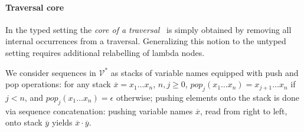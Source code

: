 \documentclass{elsarticle}
\theoremstyle{plain}
\theoremstyle{definition}
\newcommand\VarSet{\mathcal{V}}
\begin{document}
\paragraph{Traversal core}

In the typed setting the \emph{core of a traversal}~\cite{BlumPhd} is simply obtained by removing all internal occurrences from a traversal.
Generalizing this notion to the untyped setting requires
additional relabelling of lambda nodes.

We consider sequences in $\VarSet^*$ as stacks of variable names equipped with  push and pop operations: for any stack $\overline{x} = x_1 \ldots x_n$, $n,j\geq0$, $pop_j (x_1 \ldots x_n) = x_{j+1} \ldots x_n$ if $j<n$, and $pop_j (x_1 \ldots x_n) = \epsilon$ otherwise;
pushing elements onto the stack is done via sequence concatenation:
 pushing  variable names $\overline{x}$, read from right to left, onto stack $\overline{y}$ yields  $\overline{x} \cdot \overline{y}$.
\end{document}
